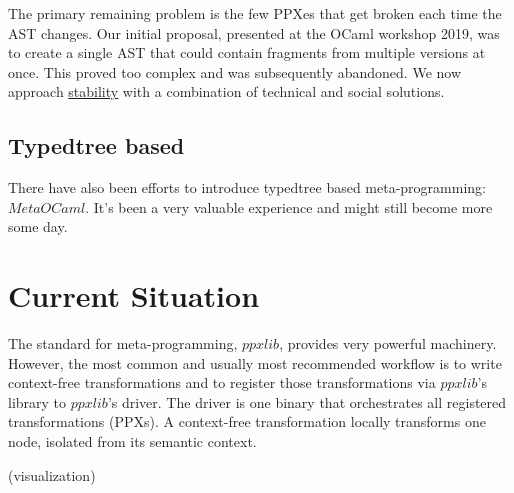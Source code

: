 \documentclass[10pt, a4paper, twocolumn]{article}
\begin{document}
The primary remaining problem is the few PPXes that get broken each time the AST
changes. Our initial proposal, presented at the OCaml workshop
2019\cite{workshop2019}, was to create a single AST that could contain fragments
from multiple versions at once. This proved too complex and was subsequently
abandoned. We now approach \hyperref[stability]{stability} with a combination of
technical and social solutions.

\subsection{Typedtree based}

There have also been efforts to introduce typedtree based meta-programming:
$MetaOCaml$\cite{metaocaml}. It's been a very valuable experience and might
still become more some day.

\section{Current Situation}

The standard for meta-programming, $ppxlib$, provides very powerful machinery.
However, the most common and usually most recommended workflow is to write
context-free transformations and to register those transformations via
$ppxlib$'s library to $ppxlib$'s driver. The driver is one binary that
orchestrates all registered transformations (PPXs). A context-free
transformation locally transforms one node, isolated from its semantic context.

\vspace{20pt}

(visualization)
\end{document}
